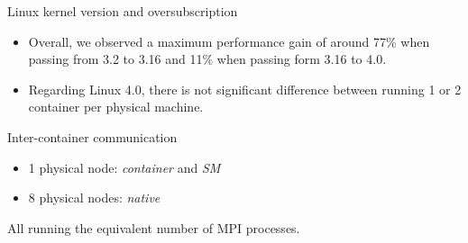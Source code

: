 \documentclass[presentation]{beamer}
\begin{document}
\begin{frame}[label=sec-3-4]{Linux kernel version and oversubscription}
\begin{itemize}
\item Overall, we observed a maximum performance gain of around 77\%
when passing from 3.2 to 3.16 and 11\% when passing form 3.16 to 4.0.

\item Regarding Linux 4.0, there is not significant difference between running 1 or 2 container per physical machine.
\end{itemize}
\end{frame}

\begin{frame}[label=sec-3-5]{Inter-container communication}
\begin{itemize}
\item 1 physical node: \emph{container} and \emph{SM}
\item 8 physical nodes: \emph{native}
\end{itemize}

All running the equivalent number of MPI processes.


\end{frame}
\end{document}
